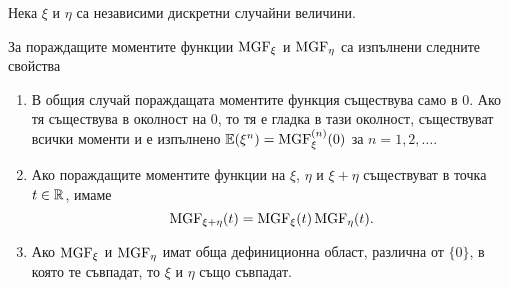 \documentclass[numbers=endperiod, DIV=15, bibliography=totocnumbered]{scrartcl}
\begin{document}
\begin{theorem}\label{thm:mgf-props}
  Нека $\xi$ и $\eta$ са независими дискретни случайни величини.

  За пораждащите моментите функции $\operatorname{MGF}_\xi$ и $\operatorname{MGF}_\eta$ са изпълнени следните свойства
  \begin{enumerate}
    \item В общия случай пораждащата моментите функция съществува само в $0$. Ако тя съществува в околност на $0$, то тя е гладка в тази околност, съществуват всички моменти и е изпълнено $\mathbb{E}(\xi^n) = \operatorname{MGF}_\xi^{(n)} (0)$ за $n = 1, 2, \ldots$.

    \item Ако пораждащите моментите функции на $\xi$, $\eta$ и $\xi + \eta$ съществуват в точка $t \in \mathbb{R}$, имаме
    \begin{displaymath}
      \operatorname{MGF}_{\xi + \eta}(t) = \operatorname{MGF}_\xi(t) \operatorname{MGF}_\eta(t).
    \end{displaymath}

    \item Ако $\operatorname{MGF}_\xi$ и $\operatorname{MGF}_\eta$ имат обща дефиниционна област, различна от $\{ 0 \}$, в която те съвпадат, то $\xi$ и $\eta$ също съвпадат.
  \end{enumerate}
\end{theorem}
\end{document}
